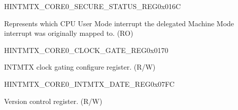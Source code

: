 \begin{register}{H}{INTMTX\_CORE0\_SECURE\_STATUS\_REG}{0x016C}\label{regdesc:INTMTXCORE0SECURESTATUSREG}
%
\regnewline%
\begin{regdesc}\begin{reglist}
\label{fielddesc:INTMTXCORE0INTSECURESTATUS}\item [INTMTX\_CORE0\_INT\_SECURE\_STATUS] Represents which CPU User Mode interrupt the delegated Machine Mode interrupt was originally mapped to. (RO)
\end{reglist}\end{regdesc}
\end{register}



\begin{register}{H}{INTMTX\_CORE0\_CLOCK\_GATE\_REG}{0x0170}\label{regdesc:INTMTXCORE0CLOCKGATEREG}
%
%
\regnewline%
\begin{regdesc}\begin{reglist}
\label{fielddesc:INTMTXCORE0REGCLKEN}\item [INTMTX\_CORE0\_REG\_CLK\_EN] INTMTX clock gating configure register. (R/W)
\end{reglist}\end{regdesc}
\end{register}


\begin{register}{H}{INTMTX\_CORE0\_INTMTX\_DATE\_REG}{0x07FC}\label{regdesc:INTMTXCORE0INTMTXDATEREG}
%
%
\regnewline%
\begin{regdesc}\begin{reglist}
\label{fielddesc:INTMTXCORE0INTMTXDATE}\item [INTMTX\_CORE0\_INTMTX\_DATE] Version control register. (R/W)
\end{reglist}\end{regdesc}
\end{register}


